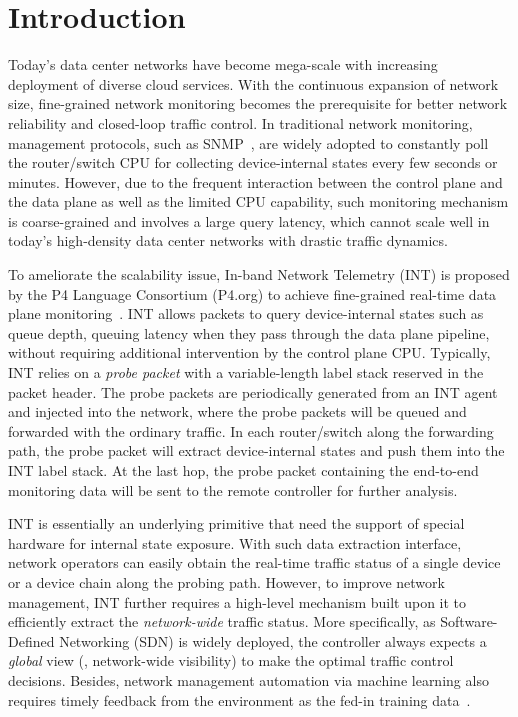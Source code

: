 \section{Introduction}

Today's data center networks have become mega-scale with increasing deployment of diverse cloud services. With the continuous expansion of network size, fine-grained network monitoring becomes the prerequisite for better network reliability and closed-loop traffic control. In traditional network monitoring, management protocols, such as SNMP~\cite{case1990simple}, are widely adopted to constantly poll the router/switch CPU for collecting device-internal states every few seconds or minutes. However, due to the frequent interaction between the control plane and the data plane as well as the limited CPU capability, such monitoring mechanism is coarse-grained and involves a large query latency, which cannot scale well in today's high-density data center networks with drastic traffic dynamics.
 
To ameliorate the scalability issue, In-band Network Telemetry (INT) is proposed by the P4 Language Consortium (P4.org) to achieve fine-grained real-time data plane monitoring~\cite{kim2015band}. INT allows packets to query device-internal states such as queue depth, queuing latency when they pass through the data plane pipeline, without requiring additional intervention by the control plane CPU. Typically, INT relies on a \emph{probe packet} with a variable-length label stack reserved in the packet header. The probe packets are periodically generated from an INT agent and injected into the network, where the probe packets will be queued and forwarded with the ordinary traffic. In each router/switch along the forwarding path, the probe packet will extract device-internal states and push them into the INT label stack. At the last hop, the probe packet containing the end-to-end monitoring data will be sent to the remote controller for further analysis.

INT is essentially an underlying primitive that need the support of special hardware for internal state exposure. With such data extraction interface, network operators can easily obtain the real-time traffic status of a single device or a device chain along the probing path. However, to improve network management, INT further requires a high-level mechanism built upon it to efficiently extract the \emph{network-wide} traffic status. More specifically, as Software-Defined Networking (SDN) is widely deployed, the controller always expects a \emph{global} view (\ie, network-wide visibility) to make the optimal traffic control decisions. Besides, network management automation via machine learning also requires timely feedback from the environment as the fed-in training data~\cite{mestres2017knowledge}. 

